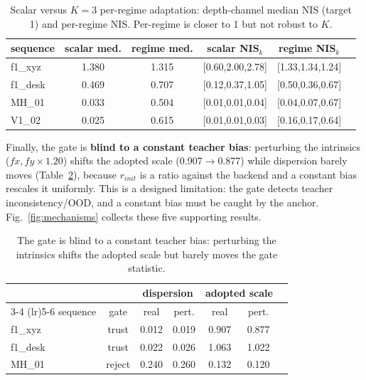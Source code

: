 \begin{table}[t]
\centering
\caption{Scalar versus $K{=}3$ per-regime adaptation: depth-channel median NIS
(target 1) and per-regime NIS. Per-regime is closer to 1 but not robust to $K$.}
\label{tab:sigma}
\footnotesize
\setlength{\tabcolsep}{3pt}
\begin{tabular}{@{}lccccc@{}}
\toprule
sequence & scalar med. & regime med. & scalar NIS$_k$ & regime NIS$_k$ \\
\midrule
f1\_xyz & 1.380 & 1.315 & [0.60,2.00,2.78] & [1.33,1.34,1.24] \\
f1\_desk & 0.469 & 0.707 & [0.12,0.37,1.05] & [0.50,0.36,0.67] \\
MH\_01 & 0.033 & 0.504 & [0.01,0.01,0.04] & [0.04,0.07,0.67] \\
V1\_02 & 0.025 & 0.615 & [0.01,0.01,0.03] & [0.16,0.17,0.64] \\
\bottomrule
\end{tabular}
\end{table}

Finally, the gate is \textbf{blind to a constant teacher bias}: perturbing the
intrinsics ($fx,fy\times1.20$) shifts the adopted scale (0.907$\to$0.877) while
dispersion barely moves (Table~\ref{tab:bias}), because $r_{init}$ is a ratio
against the backend and a
constant bias rescales it uniformly. This is a designed limitation: the gate
detects teacher inconsistency/OOD, and a constant bias must be caught by the
anchor. Fig.~\ref{fig:mechanisms} collects these five supporting results.

\begin{table}[t]
\centering
\caption{The gate is blind to a constant teacher bias: perturbing the intrinsics
shifts the adopted scale but barely moves the gate statistic.}
\label{tab:bias}
\footnotesize
\setlength{\tabcolsep}{5pt}
\begin{tabular}{@{}lcccccc@{}}
\toprule
 & & \multicolumn{2}{c}{dispersion} & \multicolumn{2}{c}{adopted scale} \\
\cmidrule(lr){3-4} \cmidrule(lr){5-6}
sequence & gate & real & pert. & real & pert. \\
\midrule
f1\_xyz & trust & 0.012 & 0.019 & 0.907 & 0.877 \\
f1\_desk & trust & 0.022 & 0.026 & 1.063 & 1.022 \\
MH\_01 & reject & 0.240 & 0.260 & 0.132 & 0.120 \\
\bottomrule
\end{tabular}
\end{table}

